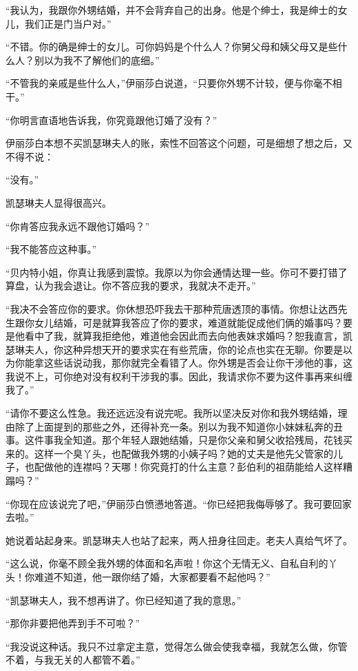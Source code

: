 \par “我认为，我跟你外甥结婚，并不会背弃自己的出身。他是个绅士，我是绅士的女儿，我们正是门当户对。”
\par “不错。你的确是绅士的女儿。可你妈妈是个什么人？你舅父母和姨父母又是些什么人？别以为我不了解他们的底细。”
\par “不管我的亲戚是些什么人，”伊丽莎白说道，“只要你外甥不计较，便与你毫不相干。”
\par “你明言直语地告诉我，你究竟跟他订婚了没有？”
\par 伊丽莎白本想不买凯瑟琳夫人的账，索性不回答这个问题，可是细想了想之后，又不得不说：
\par “没有。”
\par 凯瑟琳夫人显得很高兴。
\par “你肯答应我永远不跟他订婚吗？”
\par “我不能答应这种事。”
\par “贝内特小姐，你真让我感到震惊。我原以为你会通情达理一些。你可不要打错了算盘，认为我会退让。你不答应我的要求，我就决不走开。”
\par “我决不会答应你的要求。你休想恐吓我去干那种荒唐透顶的事情。你想让达西先生跟你女儿结婚，可是就算我答应了你的要求，难道就能促成他们俩的婚事吗？要是他看中了我，就算我拒绝他，难道他会因此而去向他表妹求婚吗？恕我直言，凯瑟琳夫人，你这种异想天开的要求实在有些荒唐，你的论点也实在无聊。你要是以为你能拿这些话说动我，那你就完全看错了人。你外甥是否会让你干涉他的事，这我说不上，可你绝对没有权利干涉我的事。因此，我请求你不要为这件事再来纠缠我了。”
\par “请你不要这么性急。我还远远没有说完呢。我所以坚决反对你和我外甥结婚，理由除了上面提到的那些之外，还得补充一条。别以为我不知道你小妹妹私奔的丑事。这件事我全知道。那个年轻人跟她结婚，只是你父亲和舅父收拾残局，花钱买来的。这样一个臭丫头，也配做我外甥的小姨子吗？她的丈夫是他先父管家的儿子，也配做他的连襟吗？天哪！你究竟打的什么主意？彭伯利的祖荫能给人这样糟蹋吗？”
\par “你现在应该说完了吧，”伊丽莎白愤懑地答道。“你已经把我侮辱够了。我可要回家去啦。”
\par 她说着站起身来。凯瑟琳夫人也站了起来，两人扭身往回走。老夫人真给气坏了。
\par “这么说，你毫不顾全我外甥的体面和名声啦！你这个无情无义、自私自利的丫头！你难道不知道，他一跟你结了婚，大家都要看不起他吗？”
\par “凯瑟琳夫人，我不想再讲了。你已经知道了我的意思。”
\par “那你非要把他弄到手不可啦？”
\par “我没说这种话。我只不过拿定主意，觉得怎么做会使我幸福，我就怎么做，你管不着，与我无关的人都管不着。”

